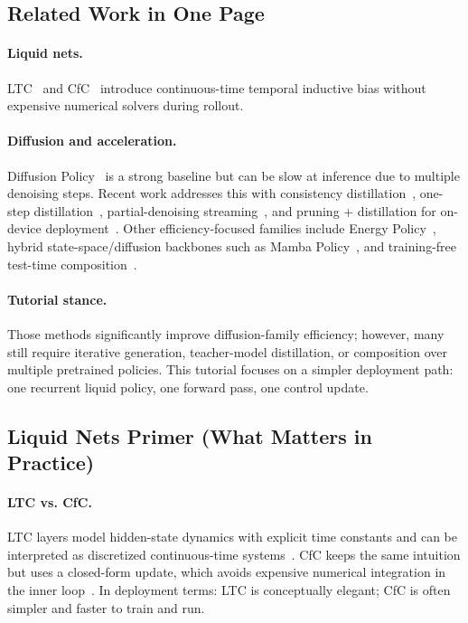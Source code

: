 \documentclass{article}
\begin{document}
\subsection{Related Work in One Page}
\paragraph{Liquid nets.}
LTC~\cite{hasani2021ltc} and CfC~\cite{hasani2022cfc} introduce continuous-time temporal inductive bias without expensive numerical solvers during rollout.

\paragraph{Diffusion and acceleration.}
Diffusion Policy~\cite{chi2023diffusion,ho2020ddpm} is a strong baseline but can be slow at inference due to multiple denoising steps. Recent work addresses this with consistency distillation~\cite{prasad2024consistency}, one-step distillation~\cite{wang2024onedp}, partial-denoising streaming~\cite{hoeg2024sdp}, and pruning + distillation for on-device deployment~\cite{wu2025lightdp}. Other efficiency-focused families include Energy Policy~\cite{jia2025energy}, hybrid state-space/diffusion backbones such as Mamba Policy~\cite{cao2024mamba}, and training-free test-time composition~\cite{cao2025gpc}.

\paragraph{Tutorial stance.}
Those methods significantly improve diffusion-family efficiency; however, many still require iterative generation, teacher-model distillation, or composition over multiple pretrained policies. This tutorial focuses on a simpler deployment path: one recurrent liquid policy, one forward pass, one control update.

\subsection{Liquid Nets Primer (What Matters in Practice)}
\paragraph{LTC vs. CfC.}
LTC layers model hidden-state dynamics with explicit time constants and can be interpreted as discretized continuous-time systems~\cite{hasani2021ltc}. CfC keeps the same intuition but uses a closed-form update, which avoids expensive numerical integration in the inner loop~\cite{hasani2022cfc}. In deployment terms: LTC is conceptually elegant; CfC is often simpler and faster to train and run.
\end{document}
